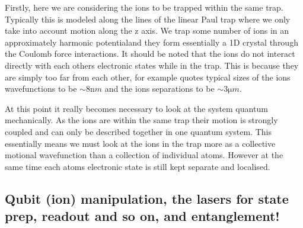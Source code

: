Firstly, here we are considering the ions to be trapped within the same trap.
Typically this is modeled along the lines of the linear Paul trap where we only take into account motion along the z axis.
We trap some number of ions in an approximately harmonic potential\footnotemark and they form essentially a 1D crystal through the Coulomb force interactions.
It should be noted that the ions do not interact directly with each others electronic states while in the trap.
This is because they are simply too far from each other, for example \cite{schaferFastGatesMixedSpecies2020} quotes typical sizes of the ions wavefunctions to be $\sim 8 \si{\nano m}$ and the ions separations to be $\sim 3 \si{\micro m}$.


At this point it really becomes necessary to look at the system quantum mechanically.
As the ions are within the same trap their motion is strongly coupled and can only be described together in one quantum system.
This essentially means we must look at the ions in the trap more as a collective motional wavefunction than a collection of individual atoms.
However at the same time each atoms electronic state is still kept separate and localised.






\subsection{Qubit (ion) manipulation, the lasers for state prep, readout and so on, and entanglement!}

